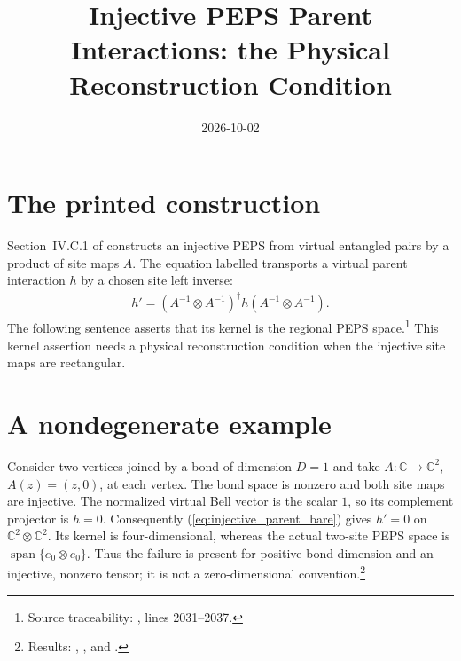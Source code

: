 \documentclass{article}
\title{Injective PEPS Parent Interactions: the Physical Reconstruction Condition}
\author{}
\date{2026-10-02}
\begin{document}
\maketitle
{}

\section{The printed construction}
Section~IV.C.1 of \cite{Cirac2021Matrix} constructs an injective PEPS
from virtual entangled pairs by a product of site maps $A$.
The equation labelled  transports a virtual
parent interaction $h$ by a chosen site left inverse:
\begin{align}
    h'=(A^{-1}\otimes A^{-1})^\dagger
             h(A^{-1}\otimes A^{-1}).
    \label{eq:injective_parent_bare}
\end{align}
The following sentence asserts that its kernel is the regional PEPS
space.\footnote{Source traceability:
    , lines 2031--2037.}
This kernel assertion needs a physical reconstruction condition when
the injective site maps are rectangular.

\section{A nondegenerate example}
Consider two vertices joined by a bond of dimension $D=1$ and take
$A:\mathbb C\longrightarrow\mathbb C^2$, $A(z)=(z,0)$, at each vertex.
The bond space is nonzero and both site maps are injective.
The normalized virtual Bell vector is the scalar $1$, so its complement
projector is $h=0$. Consequently (\ref{eq:injective_parent_bare}) gives
$h'=0$ on $\mathbb C^2\otimes\mathbb C^2$. Its kernel is four-dimensional,
whereas the actual two-site PEPS space is
$\operatorname{span}\{e_0\otimes e_0\}$.
Thus the failure is present for positive bond dimension and an injective,
nonzero tensor; it is not a zero-dimensional convention.\footnote{Results:
    ,
    , and
    .}

\end{document}
